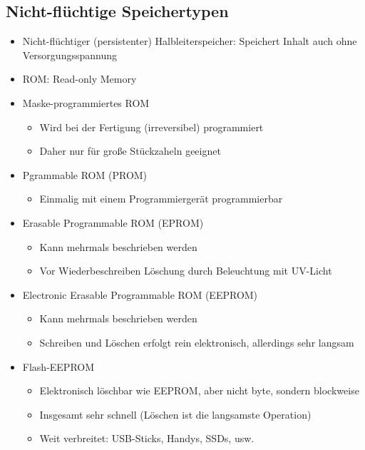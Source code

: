 \documentclass{kit}
\begin{document}
  \subsection{Nicht-flüchtige Speichertypen}
    \begin{itemize}
    \item Nicht-flüchtiger (persistenter) Halbleiterspeicher: Speichert Inhalt auch ohne 
      Versorgungsspannung
    \item ROM: Read-only Memory
    \item Maske-programmiertes ROM
      \begin{itemize}
        \item Wird bei der Fertigung (irreversibel) programmiert
        \item Daher nur für große Stückzaheln geeignet
      \end{itemize}
    \item Pgrammable ROM (PROM)
      \begin{itemize}
        \item Einmalig mit einem Programmiergerät programmierbar
      \end{itemize}
    \item Erasable Programmable ROM (EPROM)
      \begin{itemize}
        \item Kann mehrmals beschrieben werden
        \item Vor Wiederbeschreiben Löschung durch Beleuchtung mit UV-Licht
      \end{itemize}
    \item Electronic Erasable Programmable ROM (EEPROM)
      \begin{itemize}
        \item Kann mehrmals beschrieben werden
        \item Schreiben und Löschen erfolgt rein elektronisch, allerdings sehr langsam
      \end{itemize}
    \item Flash-EEPROM
      \begin{itemize}
        \item Elektronisch löschbar wie EEPROM, aber nicht byte, sondern blockweise
        \item Insgesamt sehr schnell (Löschen ist die langsamste Operation)
        \item Weit verbreitet: USB-Sticks, Handys, SSDs, usw.
      \end{itemize}
    \end{itemize}
\end{document}

